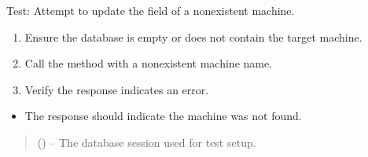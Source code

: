 \documentclass[letterpaper,10pt,english]{sphinxmanual}
\begin{document}

\begin{fulllineitems}
\label{\detokenize{test:test.test_machine.test_update_machine_date_not_found}}
\pysigstartsignatures
\pysiglinewithargsret
{}
{}
{}
\pysigstopsignatures
\sphinxAtStartPar
Test: Attempt to update the  field of a non\sphinxhyphen{}existent machine.
\begin{description}
\begin{enumerate}
%
\item {} 
\sphinxAtStartPar
Ensure the database is empty or does not contain the target machine.

\item {} 
\sphinxAtStartPar
Call the  method with a non\sphinxhyphen{}existent machine name.

\item {} 
\sphinxAtStartPar
Verify the response indicates an error.

\end{enumerate}

\begin{itemize}
\item {} 
\sphinxAtStartPar
The response should indicate the machine was not found.

\end{itemize}

\end{description}
\begin{quote}\begin{description}
\sphinxAtStartPar
{} () – The database session used for test setup.

\end{description}\end{quote}

\end{fulllineitems}

\end{document}
